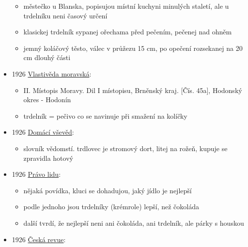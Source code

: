 \begin{itemize}
  \begin{itemize}
  \tightlist
  \item
    městečko u Blanska, popisujou místní kuchyni minulých staletí, ale u
    trdelníku neni časový určení
  \item
    klasickej trdelník sypanej ořechama před pečením, pečenej nad ohněm
  \item
    jemný koláčový těsto, válec v průžezu 15 cm, po opečení rozsekanej
    na 20 cm dlouhý části
  \end{itemize}
\item
  1926
  \href{https://ceskadigitalniknihovna.cz/view/uuid:3ffb22b9-dde8-4a93-b4f9-7eb3f9242f73?page=uuid\%3A864331ed-50a3-11e5-8200-0050569d679d&fulltext=trdeln\%C3\%ADk\%20OR\%20trdeln\%C3\%ADky\%20OR\%20trdeln\%C3\%ADk\%C5\%AF&source=mzk}{Vlastivěda
  moravská}:

  \begin{itemize}
  \tightlist
  \item
    II. Místopis Moravy. Dil I místopisu, Brněnský kraj. {[}Čís. 45a{]},
    Hodonský okres - Hodonín
  \item
    trdelník = pečivo co se navinuje při smažení na kolíčky
  \end{itemize}
\item
  1926
  \href{https://ceskadigitalniknihovna.cz/view/uuid:42a39d90-3138-11ea-a83e-005056827e51?page=uuid\%3A0cfdfefd-f5fd-45f2-9d3e-cb5a4563b2c2&fulltext=trdlovec&source=mzk}{Domácí
  vševěd}:

  \begin{itemize}
  \tightlist
  \item
    slovník vědomstí. trdlovec je stromový dort, litej na rožeň, kupuje
    se zpravidla hotový
  \end{itemize}
\item
  1926
  \href{https://ceskadigitalniknihovna.cz/view/uuid:b91df880-8a84-11ef-bcc2-005056825209?page=uuid\%3A3da0dc0d-49de-4574-b04d-eeda66a7b25a&fulltext=trdeln\%C3\%ADk\%20OR\%20trdeln\%C3\%ADky\%20OR\%20trdeln\%C3\%ADk\%C5\%AF&source=nkp}{Právo
  lidu}:

  \begin{itemize}
  \tightlist
  \item
    nějaká povídka, kluci se dohadujou, jaký jídlo je nejlepší
  \item
    podle jednoho jsou trdelníky (krémrole) lepší, než čokoláda
  \item
    další tvrdí, že nejlepší neni ani čokoláda, ani trdelník, ale párky
    s houskou
  \end{itemize}
\item
  1926
  \href{https://ceskadigitalniknihovna.cz/uuid/uuid:58b8aad0-3d9c-11e8-b52f-5ef3fc9ae867}{Česká
  revue}:


\end{itemize}
